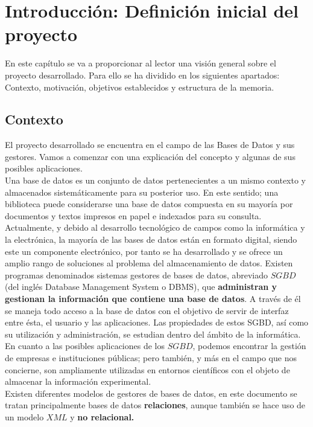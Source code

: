 \documentclass[12pt,a4paper]{article}
\begin{document}
\newpage
\section{Introducción: Definición inicial del proyecto} \label{intro}

En este capítulo se va a proporcionar al lector una visión general sobre el proyecto desarrollado. Para ello se ha dividido en los siguientes apartados: Contexto, motivación, objetivos establecidos y  estructura de la memoria.
\subsection{Contexto} \label{pto11}
El proyecto desarrollado se encuentra en el campo de las Bases de Datos y sus gestores. Vamos a comenzar con una explicación del concepto y algunas de sus posibles aplicaciones.\\

Una base de datos es un conjunto de datos pertenecientes a un mismo contexto y almacenados sistemáticamente para su posterior uso. En este sentido; una biblioteca puede considerarse una base de datos compuesta en su mayoría por documentos y textos impresos en papel e indexados para su consulta. Actualmente, y debido al desarrollo tecnológico de campos como la informática y la electrónica, la mayoría de las bases de datos están en formato digital, siendo este un componente electrónico, por tanto se ha desarrollado y se ofrece un amplio rango de soluciones al problema del almacenamiento de datos.
Existen programas denominados sistemas gestores de bases de datos, abreviado $SGBD$ (del inglés Database Management System o DBMS), que \textbf{administran y gestionan la información que contiene una base de datos}.
 A través de él se maneja todo acceso a la base de datos con el objetivo de servir de interfaz entre ésta, el usuario y las aplicaciones. Las propiedades de estos SGBD, así como su utilización y administración, se estudian dentro del ámbito de la informática.\\

En cuanto a las posibles aplicaciones de los $SGBD$, podemos encontrar la gestión de empresas e instituciones públicas; pero también, y más en el campo que nos concierne, son ampliamente utilizadas en entornos científicos con el objeto de almacenar la información experimental.\\

Existen diferentes modelos de gestores de bases de datos, en este documento se tratan principalmente bases de datos \textbf{relaciones}, aunque también se hace uso de un modelo $XML$ y \textbf{no relacional.}\\
\end{document}
